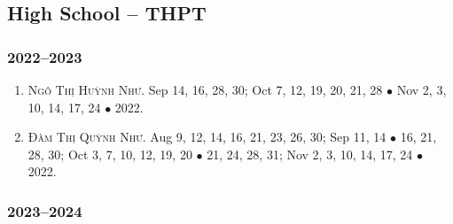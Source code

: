 \documentclass{article}
\begin{document}

\subsection{High School -- THPT}

\subsubsection{2022--2023}

\begin{enumerate}
	\item \textsc{Ngô Thị Huỳnh Như.} {\sf[In]} Sep 14, 16, 28, 30; Oct 7, 12, 19, 20, 21, 28 $\bullet$ Nov 2, 3, 10, 14, 17, 24 $\bullet$ 2022. {\sf[Out]}
	\item \textsc{Đàm Thị Quỳnh Như.} {\sf[In]} Aug 9, 12, 14, 16, 21, 23, 26, 30; Sep 11, 14 $\bullet$ 16, 21, 28, 30; Oct 3, 7, 10, 12, 19, 20 $\bullet$ 21, 24, 28, 31; Nov 2, 3, 10, 14, 17, 24 $\bullet$ 2022. {\sf[Out]}
\end{enumerate}

\subsubsection{2023--2024}


\printbibliography[heading=bibintoc]
	
\end{document}
